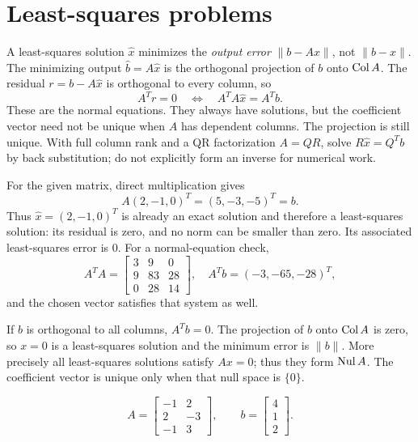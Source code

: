 \section{Least-squares problems}
A least-squares solution $\widehat x$ minimizes the \emph{output error}
$\|b-Ax\|$, not $\|b-x\|$. The minimizing output
$\widehat b=A\widehat x$ is the orthogonal projection of $b$
onto $\operatorname{Col} A$. The residual $r=b-A\widehat x$ is orthogonal
to every column, so
\[
 A^Tr=0\quad\Longleftrightarrow\quad A^TA\widehat x=A^Tb.
\]
These are the normal equations. They always have solutions, but the
coefficient vector need not be unique when $A$ has dependent columns.
The projection is still unique. With full column rank and a QR
factorization $A=QR$, solve $R\widehat x=Q^Tb$ by back substitution;
do not explicitly form an inverse for numerical work.

For the given matrix, direct multiplication gives
\[
 A(2,-1,0)^T=(5,-3,-5)^T=b.
\]
Thus $\widehat x=(2,-1,0)^T$ is already an exact solution and
therefore a least-squares solution: its residual is zero, and no norm
can be smaller than zero. Its associated least-squares error is $0$.
For a normal-equation check,
\[
 A^TA=\begin{bmatrix}3&9&0\\9&83&28\\0&28&14\end{bmatrix},\quad
 A^Tb=(-3,-65,-28)^T,
\]
and the chosen vector satisfies that system as well.

If $b$ is orthogonal to all columns, $A^Tb=0$. The projection
of $b$ onto $\operatorname{Col} A$ is zero, so $x=0$ is a least-squares
solution and the minimum error is $\|b\|$.
More precisely all least-squares solutions satisfy $Ax=0$; thus
they form $\operatorname{Nul} A$. The coefficient vector is unique only when
that null space is $\{0\}$.

\[ A=\begin{bmatrix}-1 & 2\\2 & -3\\-1 & 3\end{bmatrix},\qquad b=\begin{bmatrix}4\\1\\2\end{bmatrix}.\]

